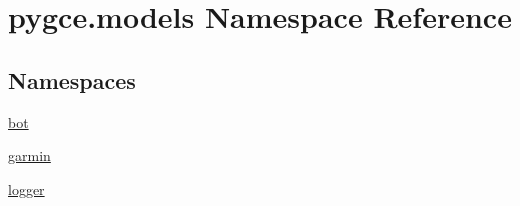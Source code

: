 \hypertarget{namespacepygce_1_1models}{}\section{pygce.\+models Namespace Reference}
\label{namespacepygce_1_1models}
\subsection*{Namespaces}
\begin{DoxyCompactItemize}
\item 
 \hyperlink{namespacepygce_1_1models_1_1bot}{bot}
\item 
 \hyperlink{namespacepygce_1_1models_1_1garmin}{garmin}
\item 
 \hyperlink{namespacepygce_1_1models_1_1logger}{logger}
\end{DoxyCompactItemize}
